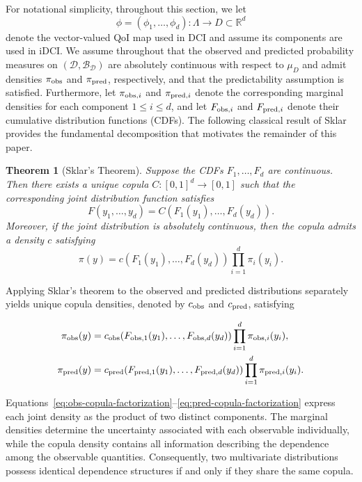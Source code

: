 \documentclass{article}
\newtheorem{theorem}{Theorem}[section]
\newcommand{\B}{\mathcal{B}}
\newcommand{\dspace}{\mathcal{D}}
\begin{document}
For notational simplicity, throughout this section, we let
\[
\phi=(\phi_1,\ldots,\phi_d):\Lambda\to D\subset\mathbb R^d
\]
denote the vector-valued QoI map used in DCI and assume its components are used in iDCI.
We assume throughout that the observed and predicted probability measures on $(\dspace,\B_\dspace)$ are absolutely continuous with respect to $\mu_D$ and admit densities $\pi_{\rm obs}$ and $\pi_{\rm pred}$, respectively, and that the predictability assumption is satisfied.
Furthermore, let $\pi_{{\rm obs},i}$ and $\pi_{{\rm pred},i}$ denote the corresponding marginal densities for each component $1\le i\le d$, and let $F_{{\rm obs},i}$ and $F_{{\rm pred},i}$
denote their cumulative distribution functions (CDFs).
The following classical result of Sklar provides the fundamental decomposition that motivates the remainder of this paper.

\begin{theorem}[Sklar's Theorem]
Suppose the CDFs $F_1,\ldots,F_d$
are continuous.
Then there exists a unique copula
$C:[0,1]^d\to[0,1]$ such that the corresponding joint distribution function satisfies
\[
F(y_1,\ldots,y_d)
=
C(F_1(y_1),\ldots,F_d(y_d)).
\]
Moreover, if the joint distribution is absolutely continuous, then the copula admits a density $c$ satisfying
\[
\pi(y)
=
c(F_1(y_1),\ldots,F_d(y_d))
\prod_{i=1}^d
\pi_i(y_i).
\]
\end{theorem}

Applying Sklar's theorem to the observed and predicted distributions separately yields unique copula densities, denoted by $c_{\rm obs}$ and $c_{\rm pred}$, satisfying

\begin{align}
\pi_{\rm obs}(y)
&=
c_{\rm obs}\!\left(
F_{{\rm obs},1}(y_1),
\ldots,
F_{{\rm obs},d}(y_d)
\right)
\prod_{i=1}^d
\pi_{{\rm obs},i}(y_i),
\label{eq:obs-copula-factorization}
\\
\pi_{\rm pred}(y)
&=
c_{\rm pred}\!\left(
F_{{\rm pred},1}(y_1),
\ldots,
F_{{\rm pred},d}(y_d)
\right)
\prod_{i=1}^d
\pi_{{\rm pred},i}(y_i).
\label{eq:pred-copula-factorization}
\end{align}

Equations~\eqref{eq:obs-copula-factorization}--\eqref{eq:pred-copula-factorization} express each joint density as the product of two distinct components.
The marginal densities determine the uncertainty associated with each observable individually, while the copula density contains all information describing the dependence among the observable quantities.
Consequently, two multivariate distributions possess identical dependence structures if and only if they share the same copula.
\end{document}
